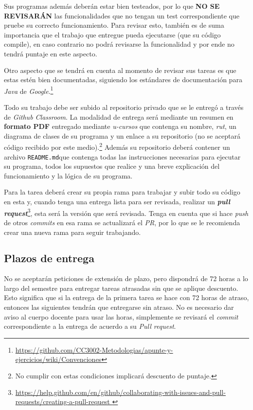     Sus programas además deberán estar bien testeados, por lo que \textbf{NO SE REVISARÁN}
    las funcionalidades que no tengan un test correspondiente que pruebe su correcto 
    funcionamiento.
    Para revisar esto, también es de suma importancia que el trabajo que entregue pueda 
    ejecutarse (que su código compile), en caso contrario no podrá revisarse la 
    funcionalidad y por ende no tendrá puntaje en este aspecto.

    Otro aspecto que se tendrá en cuenta al momento de revisar sus tareas es que estas 
    estén bien documentadas, siguiendo los estándares de documentación para 
    \textit{Java} de \textit{Google}.\footnote{
      \url{https://github.com/CC3002-Metodologias/apunte-y-ejercicios/wiki/Convenciones}
    }

    Todo su trabajo debe ser subido al repositorio privado que se le entregó a través de 
    \textit{Github Classroom}.
    La modalidad de entrega será mediante un resumen en \textbf{formato PDF} entregado 
    mediante \textit{u-cursos} que contenga su nombre, \textit{rut}, un diagrama de clases de su 
    programa y un enlace a su repositorio (no se aceptará código recibido por este 
    medio).\footnote{No cumplir con estas condiciones implicará descuento de puntaje.}
    Además su repositorio deberá contener un archivo \texttt{README.md}\footnotemark que 
    contenga todas las instrucciones necesarias para ejecutar su programa, todos los 
    supuestos que realice y una breve explicación del funcionamiento y la lógica de su 
    programa.

    Para la tarea deberá crear su propia rama para trabajar y subir todo su código en esta y, cuando
    tenga una entrega lista para ser revisada, realizar un \textbf{\textit{pull request}}\footnote{
      \url{
        https://help.github.com/en/github/collaborating-with-issues-and-pull-requests/creating-a-pull-request
      }
    }, esta será la versión que será revisada.
    Tenga en cuenta que si hace \textit{push} de otros \textit{commits} en esa rama se actualizará 
    el \textit{PR}, por lo que se le recomienda crear una nueva rama para seguir trabajando.    

  \subsection{Plazos de entrega}
    No se aceptarán peticiones de extensión de plazo, pero dispondrá de 72 horas a lo largo
    del semestre para entregar tareas atrasadas sin que se aplique descuento.
    Esto significa que si la entrega de la primera tarea se hace con 72 horas de atraso, 
    entonces las siguientes tendrán que entregarse sin atraso.
    No es necesario dar aviso al cuerpo docente para usar las horas, simplemente se 
    revisará el \textit{commit} correspondiente a la entrega de acuerdo a su \textit{Pull request}.
    
